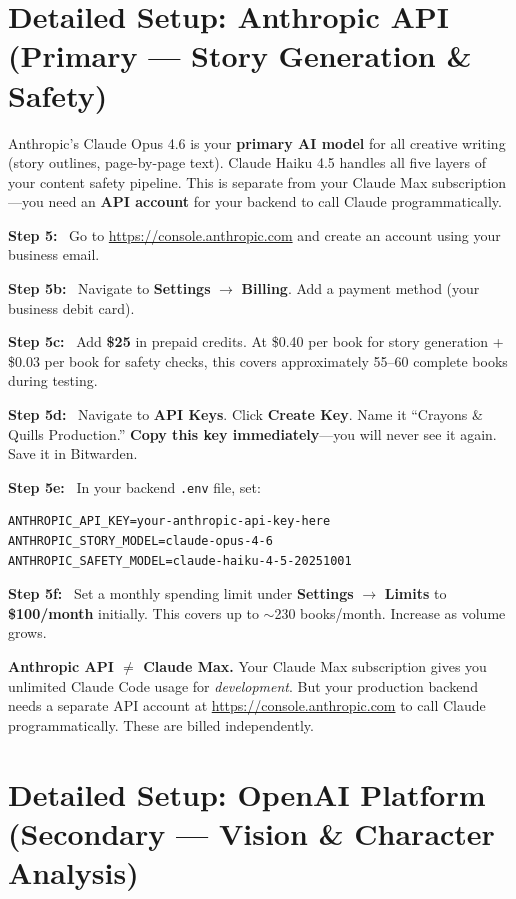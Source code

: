 \documentclass[12pt, letterpaper, oneside]{book}
\newcommand{\cost}[1]{\textcolor{money}{\textbf{#1}}}
\newcommand{\step}[1]{\noindent\textbf{\textcolor{primary}{Step #1:}}~}
\begin{document}
\section{Detailed Setup: Anthropic API (Primary --- Story Generation \& Safety)}

Anthropic's Claude Opus 4.6 is your \textbf{primary AI model} for all creative writing (story outlines, page-by-page text). Claude Haiku 4.5 handles all five layers of your content safety pipeline. This is separate from your Claude Max subscription---you need an \textbf{API account} for your backend to call Claude programmatically.

\step{5} Go to \url{https://console.anthropic.com} and create an account using your business email.

\step{5b} Navigate to \textbf{Settings} $\rightarrow$ \textbf{Billing}. Add a payment method (your business debit card).

\step{5c} Add \cost{\$25} in prepaid credits. At \$0.40 per book for story generation + \$0.03 per book for safety checks, this covers approximately 55--60 complete books during testing.

\step{5d} Navigate to \textbf{API Keys}. Click \textbf{Create Key}. Name it ``Crayons \& Quills Production.'' \textbf{Copy this key immediately}---you will never see it again. Save it in Bitwarden.

\step{5e} In your backend \texttt{.env} file, set:
\begin{verbatim}
ANTHROPIC_API_KEY=your-anthropic-api-key-here
ANTHROPIC_STORY_MODEL=claude-opus-4-6
ANTHROPIC_SAFETY_MODEL=claude-haiku-4-5-20251001
\end{verbatim}

\step{5f} Set a monthly spending limit under \textbf{Settings} $\rightarrow$ \textbf{Limits} to \cost{\$100/month} initially. This covers up to $\sim$230 books/month. Increase as volume grows.

\begin{warningbox}
\textbf{Anthropic API $\neq$ Claude Max.} Your Claude Max subscription gives you unlimited Claude Code usage for \textit{development}. But your production backend needs a separate API account at \url{https://console.anthropic.com} to call Claude programmatically. These are billed independently.
\end{warningbox}

\section{Detailed Setup: OpenAI Platform (Secondary --- Vision \& Character Analysis)}
\end{document}

